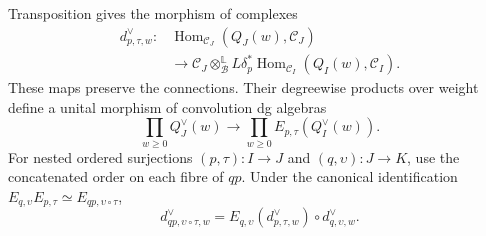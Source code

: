 \begin{proposition}
\label{prop:native-dual-collision}
Transposition gives the morphism of complexes
\begin{equation}\label{eq:native-dual-collision}
\begin{aligned}
 d^\vee_{p,\tau,w}:{}&
 \operatorname{Hom}_{\mathcal C_J}(Q_J(w),\mathcal C_J)\\
 &\longrightarrow
 \mathcal C_J\otimes_{\mathcal B}^{\mathbb L}
 L\delta_p^*\operatorname{Hom}_{\mathcal C_I}(Q_I(w),\mathcal C_I).
\end{aligned}
\end{equation}
These maps preserve the connections. Their degreewise products
over weight define a unital morphism of convolution dg algebras
\[
 \prod_{w\ge0}Q_J^\vee(w)
 \longrightarrow
 \prod_{w\ge0}E_{p,\tau}(Q_I^\vee(w)).
\]
For nested ordered surjections $(p,\tau):I\to J$ and
$(q,\upsilon):J\to K$, use the concatenated order on each fibre
of $qp$. Under the canonical identification
$E_{q,\upsilon}E_{p,\tau}\simeq E_{qp,\upsilon\circ\tau}$,
\[
 d^\vee_{qp,\upsilon\circ\tau,w}
 =E_{q,\upsilon}(d^\vee_{p,\tau,w})
       \circ d^\vee_{q,\upsilon,w}.
\]
\end{proposition}
